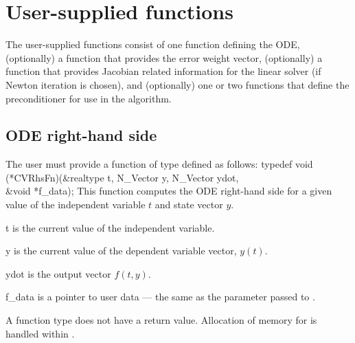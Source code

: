 \section{User-supplied functions}\label{ss:user_fct_sim}

The user-supplied functions consist of one function defining the ODE, (optionally)
a function that provides the error weight vector,
(optionally) a function that provides Jacobian related information for the linear 
solver (if Newton iteration is chosen), and (optionally) one or two functions 
that define the preconditioner for use in the {\spgmr} algorithm. 

\subsection{ODE right-hand side} \label{ss:rhsFn}
The user must provide a function of type  defined as follows:
{
  typedef void (*CVRhsFn)(&realtype t, N\_Vector y, N\_Vector ydot, \\
                          &void *f\_data);
}
{
  This function computes the ODE right-hand side for a given value
  of the independent variable $t$ and state vector $y$.
}
{
  \begin{args}[f\_data]
  \item[t]
    is the current value of the independent variable.
  \item[y]
    is the current value of the dependent variable vector, $y(t)$.
  \item[ydot]
    is the output vector $f(t,y)$.
  \item[f\_data]
    is a pointer to user data --- the same as the       
    parameter passed to .   
  \end{args}
}
{
  A  function type does not have a return value.                        
}
{
Allocation of memory for  is handled within {\cvodes}.
}

